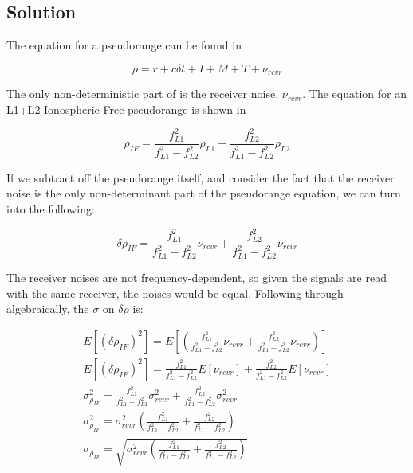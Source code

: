 \documentclass{article}
\begin{document}
\subsection*{Solution}
The equation for a pseudorange can be found in 

\begin{equation}
    \rho = r + c\delta t + I + M + T + \nu_{rcvr}\label{eq:pseudorange}
\end{equation}

The only non-deterministic part of  is the receiver noise, $\nu_{rcvr}$.  The equation for an L1+L2 Ionospheric-Free pseudorange is shown in 

\begin{equation}
    \rho_{IF} = \frac{f_{L1}^2}{f_{L1}^2 - f_{L2}^2}\rho_{L1} + \frac{f_{L2}^2}{f_{L1}^2 - f_{L2}^2}\rho_{L2}\label{eq:IF_pseudorange}
\end{equation}

If we subtract off the pseudorange itself, and consider the fact that the receiver noise is the only non-determinant part of the pseudorange equation, we can turn  into the following:

\begin{equation}
    \delta \rho_{IF} = \frac{f_{L1}^2}{f_{L1}^2 - f_{L2}^2}\nu_{rcvr} + \frac{f_{L2}^2}{f_{L1}^2 - f_{L2}^2}\nu_{rcvr}\label{eq:IF_del_psr}
\end{equation}

The receiver noises are not frequency-dependent, so given the signals are read with the same receiver, the noises would be equal.  Following  through algebraically, the $\sigma$ on $\delta \rho$ is:

\begin{gather*}
    E \left[(\delta\rho_{IF})^2\right] = E \left[(\frac{f_{L1}^2}{f_{L1}^2 - f_{L2}^2}\nu_{rcvr} + \frac{f_{L2}^2}{f_{L1}^2 - f_{L2}^2}\nu_{rcvr})\right]\\
    E \left[(\delta\rho_{IF})^2\right] = \frac{f_{L1}^2}{f_{L1}^2 - f_{L2}^2}E \left[\nu_{rcvr}\right] + \frac{f_{L2}^2}{f_{L1}^2 - f_{L2}^2}E \left[\nu_{rcvr}\right]\\
    \sigma_{\rho_{IF}}^2 =  \frac{f_{L1}^2}{f_{L1}^2 - f_{L2}^2}\sigma_{rcvr}^2 + \frac{f_{L2}^2}{f_{L1}^2 - f_{L2}^2}\sigma_{rcvr}^2\\
    \sigma_{\rho_{IF}}^2 =  \sigma_{rcvr}^2(\frac{f_{L1}^2}{f_{L1}^2 - f_{L2}^2} + \frac{f_{L2}^2}{f_{L1}^2 - f_{L2}^2})\\
    \sigma_{\rho_{IF}} =  \sqrt{\sigma_{rcvr}^2(\frac{f_{L1}^2}{f_{L1}^2 - f_{L2}^2} + \frac{f_{L2}^2}{f_{L1}^2 - f_{L2}^2})}\\
\end{gather*}
\end{document}

